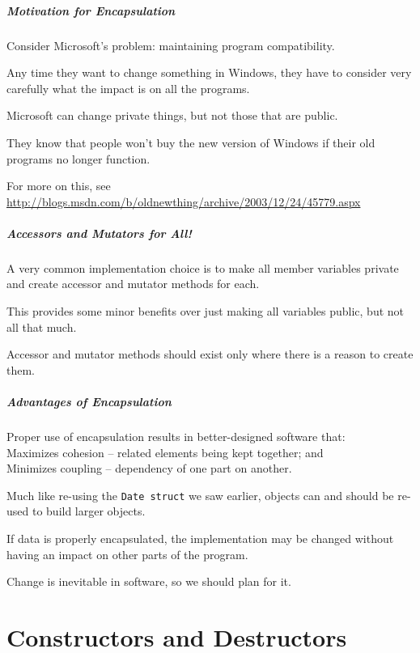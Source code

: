 \begin{frame}
\frametitle{Motivation for Encapsulation}
Consider Microsoft's problem: maintaining program compatibility.

Any time they want to change something in Windows, they have to consider very carefully what the impact is on all the programs.

Microsoft can change private things, but not those that are public.

They know that people won't buy the new version of Windows if their old programs no longer function.

For more on this, see \url{http://blogs.msdn.com/b/oldnewthing/archive/2003/12/24/45779.aspx}
\end{frame}

\begin{frame}
\frametitle{Accessors and Mutators for All!}
A very common implementation choice is to make all member variables private and create accessor and mutator methods for each.

This provides some minor benefits over just making all variables public, but not all that much.

Accessor and mutator methods should exist only where there is a reason to create them.

\end{frame}


\begin{frame}
\frametitle{Advantages of Encapsulation}
Proper use of encapsulation results in better-designed software that:\\
\quad Maximizes \alert{cohesion} -- related elements being kept together; and\\
\quad Minimizes \alert{coupling} -- dependency of one part on another.

Much like re-using the \texttt{Date struct} we saw earlier, objects can and should be re-used to build larger objects.

If data is properly encapsulated, the implementation may be changed without having an impact on other parts of the program.

Change is inevitable in software, so we should plan for it.

\end{frame}

\part{Constructors and Destructors}
\begin{frame}\partpage\end{frame}

